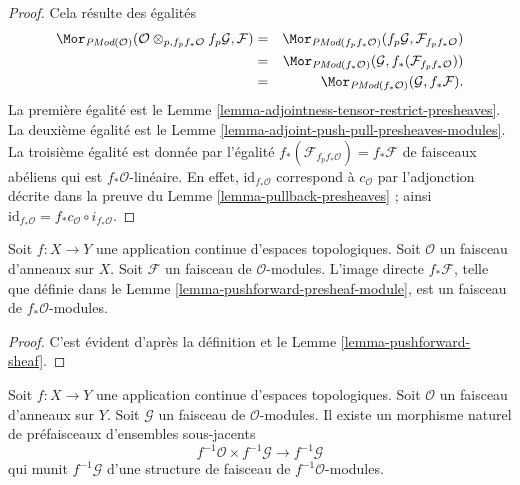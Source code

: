 \begin{proof}
Cela résulte des égalités
\begin{eqnarray*}
\Mor_{\textit{PMod}(\mathcal{O})}(
\mathcal{O} \otimes_{p, f_pf_*\mathcal{O}} f_p\mathcal{G}, \mathcal{F})
& = &
\Mor_{\textit{PMod}(f_pf_*\mathcal{O})}(
f_p\mathcal{G}, \mathcal{F}_{f_pf_*\mathcal{O}}) \\
& = &
\Mor_{\textit{PMod}(f_*\mathcal{O})}(\mathcal{G},
f_*(\mathcal{F}_{f_pf_*\mathcal{O}})) \\
& = &
\Mor_{\textit{PMod}(f_*\mathcal{O})}(\mathcal{G}, f_*\mathcal{F}).
\end{eqnarray*}
La première égalité est le
Lemme \ref{lemma-adjointness-tensor-restrict-presheaves}.
La deuxième égalité est le
Lemme \ref{lemma-adjoint-push-pull-presheaves-modules}.
La troisième égalité est donnée par l'égalité
$f_*(\mathcal{F}_{f_pf_*\mathcal{O}}) = f_*\mathcal{F}$
de faisceaux abéliens qui est $f_*\mathcal{O}$-linéaire. En effet,
$\text{id}_{f_*\mathcal{O}}$ correspond à $c_\mathcal{O}$
par l'adjonction décrite dans la preuve du
Lemme \ref{lemma-pullback-presheaves} ;
ainsi
$\text{id}_{f_*\mathcal{O}} = f_*c_\mathcal{O} \circ i_{f_*\mathcal{O}}$.
\end{proof}

\begin{lemma}
\label{lemma-pushforward-module}
Soit $f : X \to Y$ une application continue d'espaces topologiques.
Soit $\mathcal{O}$ un faisceau d'anneaux sur $X$. Soit
$\mathcal{F}$ un faisceau de $\mathcal{O}$-modules.
L'image directe $f_*\mathcal{F}$, telle que définie dans le
Lemme \ref{lemma-pushforward-presheaf-module},
est un faisceau de $f_*\mathcal{O}$-modules.
\end{lemma}

\begin{proof}
C'est évident d'après la définition et le Lemme \ref{lemma-pushforward-sheaf}.
\end{proof}

\begin{lemma}
\label{lemma-pullback-module}
Soit $f : X \to Y$ une application continue d'espaces topologiques.
Soit $\mathcal{O}$ un faisceau d'anneaux sur $Y$. Soit
$\mathcal{G}$ un faisceau de $\mathcal{O}$-modules.
Il existe un morphisme naturel de préfaisceaux d'ensembles sous-jacents
$$
f^{-1}\mathcal{O} \times f^{-1}\mathcal{G}
\longrightarrow
f^{-1}\mathcal{G}
$$
qui munit $f^{-1}\mathcal{G}$ d'une structure de
faisceau de $f^{-1}\mathcal{O}$-modules.
\end{lemma}

